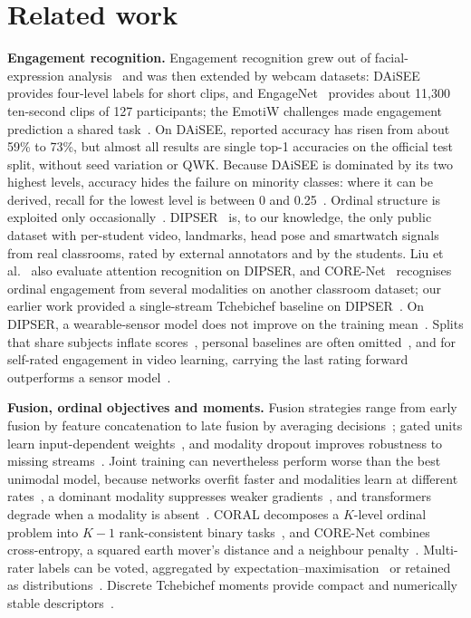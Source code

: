 \section{Related work}
\label{sec:related}

\textbf{Engagement recognition.} Engagement recognition grew out of facial-expression analysis~\cite{whitehill2014faces} and was then extended by webcam datasets: DAiSEE~\cite{gupta2016daisee} provides four-level labels for short clips, and EngageNet~\cite{singh2023engagenet} provides about 11{,}300 ten-second clips of 127 participants; the EmotiW challenges made engagement prediction a shared task~\cite{dhall2018emotiw,dhall2020emotiw}. On DAiSEE, reported accuracy has risen from about 59\% to 73\%, but almost all results are single top-1 accuracies on the official test split, without seed variation or QWK. Because DAiSEE is dominated by its two highest levels, accuracy hides the failure on minority classes: where it can be derived, recall for the lowest level is between 0 and 0.25~\cite{abedi2021resnettcn,abedi2024affectordinal,abedi2025supervised,gothwal2025vibednet}. Ordinal structure is exploited only occasionally~\cite{abedi2024affectordinal,abedi2025supervised}. DIPSER~\cite{marquezcarpintero2025dipser} is, to our knowledge, the only public dataset with per-student video, landmarks, head pose and smartwatch signals from real classrooms, rated by external annotators and by the students. Liu et al.~\cite{liu2025attention} also evaluate attention recognition on DIPSER, and CORE-Net~\cite{tran2026ordinal} recognises ordinal engagement from several modalities on another classroom dataset; our earlier work provided a single-stream Tchebichef baseline on DIPSER~\cite{makhkhas2026ordinal}. On DIPSER, a wearable-sensor model does not improve on the training mean~\cite{fragkiadakis2026fairness}. Splits that share subjects inflate scores~\cite{saeb2017need}, personal baselines are often omitted~\cite{demasi2017meaningless}, and for self-rated engagement in video learning, carrying the last rating forward outperforms a sensor model~\cite{leng2026edugage}.

\textbf{Fusion, ordinal objectives and moments.} Fusion strategies range from early fusion by feature concatenation to late fusion by averaging decisions~\cite{baltrusaitis2019multimodal}; gated units learn input-dependent weights~\cite{arevalo2017gated}, and modality dropout improves robustness to missing streams~\cite{neverova2016moddrop}. Joint training can nevertheless perform worse than the best unimodal model, because networks overfit faster and modalities learn at different rates~\cite{wang2020makes}, a dominant modality suppresses weaker gradients~\cite{peng2022balanced}, and transformers degrade when a modality is absent~\cite{ma2022robust}. CORAL decomposes a $K$-level ordinal problem into $K-1$ rank-consistent binary tasks~\cite{cao2020coral}, and CORE-Net combines cross-entropy, a squared earth mover's distance and a neighbour penalty~\cite{tran2026ordinal}. Multi-rater labels can be voted, aggregated by expectation--maximisation~\cite{dawid1979em} or retained as distributions~\cite{geng2016ldl}. Discrete Tchebichef moments provide compact and numerically stable descriptors~\cite{mukundan2001tchebichef}.
